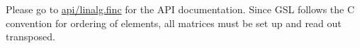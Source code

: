 Please go to \hyperlink{linalg_8finc}{api/linalg.\+finc} for the A\+P\+I documentation. Since G\+S\+L follows the C convention for ordering of elements, all matrices must be set up and read out transposed. 